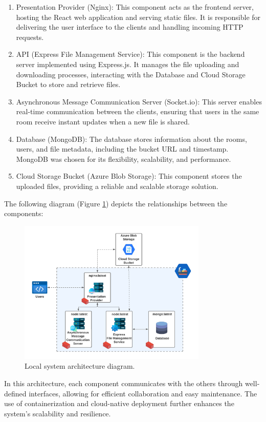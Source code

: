 \documentclass[a4paper,fleqn]{cas-dc}
\begin{document}
\begin{enumerate}
    \item Presentation Provider (Nginx): This component acts as the frontend server, hosting the React web application and serving static files. It is responsible for delivering the user interface to the clients and handling incoming HTTP requests.
    \item API (Express File Management Service): This component is the backend server implemented using Express.js. It manages the file uploading and downloading processes, interacting with the Database and Cloud Storage Bucket to store and retrieve files.
    \item Asynchronous Message Communication Server (Socket.io): This server enables real-time communication between the clients, ensuring that users in the same room receive instant updates when a new file is shared.
    \item Database (MongoDB): The database stores information about the rooms, users, and file metadata, including the bucket URL and timestamp. MongoDB was chosen for its flexibility, scalability, and performance.
    \item Cloud Storage Bucket (Azure Blob Storage): This component stores the uploaded files, providing a reliable and scalable storage solution.
\end{enumerate}

The following diagram (Figure \ref{fig:architecture}) depicts the relationships between the components:

\begin{figure}[h]
    \centering
    \includegraphics[width=9cm]{architecture.png}
    \caption{Local system architecture diagram.}
    \label{fig:architecture}
\end{figure}

In this architecture, each component communicates with the others through well-defined interfaces, allowing for efficient collaboration and easy maintenance. The use of containerization and cloud-native deployment further enhances the system's scalability and resilience.
\end{document}
